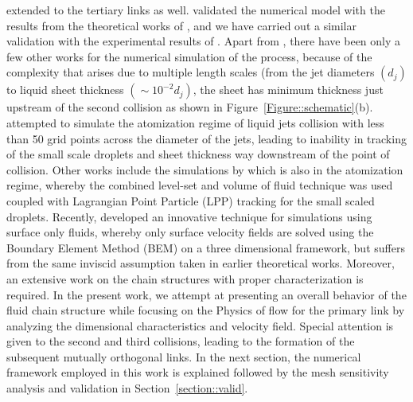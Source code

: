 \documentclass[%
aip,
sd,%
amsmath,amssymb,
preprint,%
author-year,%
]{revtex4-1}
\begin{document}
extended to the tertiary links as well. \cite{chen2013high} validated the numerical model with the results from the theoretical works of \cite{bremond2006atomization}, and we have carried out a similar validation with the experimental results of \cite{bush2004collision}. Apart from \cite{chen2013high}, there have been only a few other works for the numerical simulation of the process, because of the complexity that arises due to multiple length scales (from the jet diameters $\left(d_j\right)$ to liquid sheet thickness $\left(\sim 10^{-2}d_j\right)$, the sheet has minimum thickness just upstream of the second collision as shown in Figure~\ref{Figure::schematic}(b). \cite{inoue2008study,inoue2009liquid} attempted to simulate the atomization regime of liquid jets collision with less than 50 grid points across the diameter of the jets, leading to inability in tracking of the small scale droplets and sheet thickness way downstream of the point of collision. Other works include the simulations by \cite{arienti2012coupled} which is also in the atomization regime, whereby the combined level-set and volume of fluid technique \citep{sussman2007sharp} was used coupled with Lagrangian Point Particle (LPP) tracking for the small scaled droplets. Recently, \cite{da2016surface} developed an innovative technique for simulations using surface only fluids, whereby only surface velocity fields are solved using the Boundary Element Method (BEM) on a three dimensional framework, but suffers from the same inviscid assumption taken in earlier theoretical works. Moreover, an extensive work on the chain structures with proper characterization is required. In the present work, we attempt at presenting an overall behavior of the fluid chain structure while focusing on the Physics of flow for the primary link by analyzing the dimensional characteristics and velocity field. Special attention is given to the second and third collisions, leading to the formation of the subsequent mutually orthogonal links. In the next section, the numerical framework employed in this work is explained followed by the mesh sensitivity analysis and validation in Section~\ref{section::valid}. 
\end{document}
